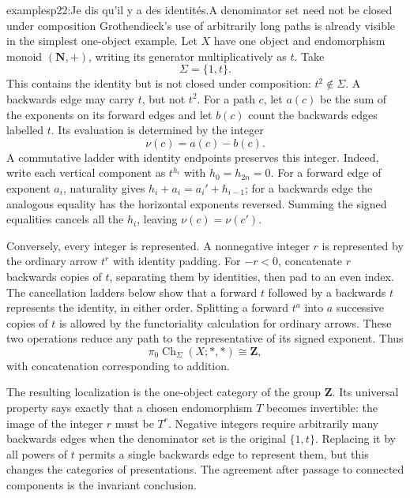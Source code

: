 \begin{dcomment}{examples}{p22:Je dis qu'il y a des identités.}{A denominator set need not be closed under composition}
Grothendieck's use of arbitrarily long paths is already visible in the simplest one-object example. Let $X$ have one object and endomorphism monoid $(\mathbf N,+)$, writing its generator multiplicatively as $t$. Take
\[
 \Sigma=\{1,t\}.
\]
This contains the identity but is not closed under composition: $t^2\notin\Sigma$. A backwards edge may carry $t$, but not $t^2$. For a path $c$, let $a(c)$ be the sum of the exponents on its forward edges and let $b(c)$ count the backwards edges labelled $t$. Its evaluation is determined by the integer
\[
 \nu(c)=a(c)-b(c).
\]
A commutative ladder with identity endpoints preserves this integer. Indeed, write each vertical component as $t^{h_i}$ with $h_0=h_{2n}=0$. For a forward edge of exponent $a_i$, naturality gives $h_i+a_i=a_i'+h_{i-1}$; for a backwards edge the analogous equality has the horizontal exponents reversed. Summing the signed equalities cancels all the $h_i$, leaving $\nu(c)=\nu(c')$.

Conversely, every integer is represented. A nonnegative integer $r$ is represented by the ordinary arrow $t^r$ with identity padding. For $-r<0$, concatenate $r$ backwards copies of $t$, separating them by identities, then pad to an even index. The cancellation ladders below show that a forward $t$ followed by a backwards $t$ represents the identity, in either order. Splitting a forward $t^a$ into $a$ successive copies of $t$ is allowed by the functoriality calculation for ordinary arrows. These two operations reduce any path to the representative of its signed exponent. Thus
\[
 \pi_0\operatorname{Ch}_\Sigma(X;*,*)\cong\mathbf Z,
\]
with concatenation corresponding to addition.

The resulting localization is the one-object category of the group $\mathbf Z$. Its universal property says exactly that a chosen endomorphism $T$ becomes invertible: the image of the integer $r$ must be $T^r$. Negative integers require arbitrarily many backwards edges when the denominator set is the original $\{1,t\}$. Replacing it by all powers of $t$ permits a single backwards edge to represent them, but this changes the categories of presentations. The agreement after passage to connected components is the invariant conclusion.
\end{dcomment}


